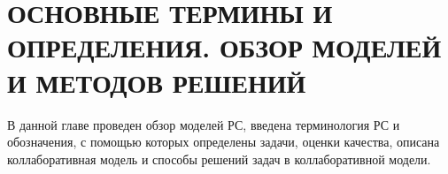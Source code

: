 \chapter{ОСНОВНЫЕ ТЕРМИНЫ И ОПРЕДЕЛЕНИЯ. ОБЗОР МОДЕЛЕЙ И МЕТОДОВ
РЕШЕНИЙ} \label{chapt1}
В данной главе проведен обзор моделей РС, введена
терминология РС и обозначения, с помощью которых определены
задачи, оценки качества, описана коллаборативная модель
и способы решений задач в коллаборативной модели.




